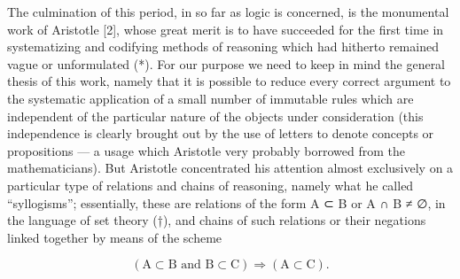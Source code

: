 The culmination of this period, in so far as logic is concerned, is the monumental work of Aristotle {[}2{]}, whose great merit is to have succeeded for the first time in systematizing and codifying methods of reasoning which had hitherto remained vague or unformulated (*). For our purpose we need to keep in mind the general thesis of this work, namely that it is possible to reduce every correct argument to the systematic application of a small number of immutable rules which are independent of the particular nature of the objects under consideration (this independence is clearly brought out by the use of letters to denote concepts or propositions --- a usage which Aristotle very probably borrowed from the mathematicians). But Aristotle concentrated his attention almost exclusively on a particular type of relations and chains of reasoning, namely what he called ``syllogisms''; essentially, these are relations of the form A ⊂ B or A ∩ B ≠ ∅, in the language of set theory (†), and chains of such relations or their negations linked together by means of the scheme

\[
(\mathrm{A} \subset \mathrm{B} \text {   and   } \mathrm{B} \subset \mathrm{C}) \Longrightarrow (\mathrm{A} \subset \mathrm{C}).
\]

